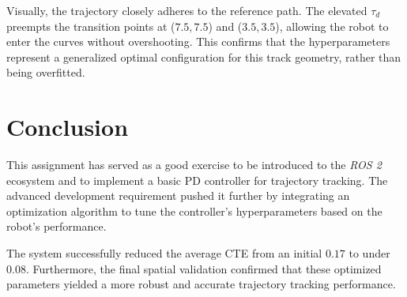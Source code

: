 \documentclass[12pt]{article}
\begin{document}
Visually, the trajectory closely adheres to the reference path. The elevated $\tau_d$ preempts the
transition points at ($7.5, 7.5$) and ($3.5, 3.5$), allowing the robot to enter the curves without
overshooting. This confirms that the hyperparameters represent a generalized optimal configuration
for this track geometry, rather than being overfitted.


\section{Conclusion}

This assignment has served as a good exercise to be introduced to the \textit{ROS 2} ecosystem and
to implement a basic PD controller for trajectory tracking. The advanced development requirement
pushed it further by integrating an optimization algorithm to tune the controller's hyperparameters
based on the robot's performance.

The system successfully reduced the average CTE from an initial $0.17$ to under $0.08$. Furthermore,
the final spatial validation confirmed that these optimized parameters yielded a more robust and
accurate trajectory tracking performance.
\end{document}

